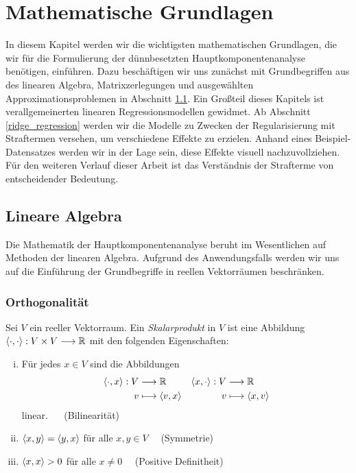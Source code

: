 \chapter{Mathematische Grundlagen}

\label{fundamentals}

In diesem Kapitel werden wir die wichtigsten mathematischen Grundlagen, die wir für die Formulierung der dünnbesetzten Hauptkomponentenanalyse benötigen, einführen. Dazu beschäftigen wir uns zunächst mit Grundbegriffen aus des linearen Algebra, Matrixzerlegungen und ausgewählten Approximationsproblemen in Abschnitt \ref{linear_algebra}. Ein Großteil dieses Kapitels ist verallgemeinerten linearen Regressionsmodellen gewidmet. Ab Abschnitt \ref{ridge_regression} werden wir die Modelle zu Zwecken der Regularisierung mit Straftermen versehen, um verschiedene Effekte zu erzielen. Anhand eines Beispiel-Datensatzes werden wir in der Lage sein, diese Effekte visuell nachzuvollziehen. Für den weiteren Verlauf dieser Arbeit ist das Verständnis der Strafterme von entscheidender Bedeutung.






\section{Lineare Algebra}
\label{linear_algebra}

Die Mathematik der Hauptkomponentenanalyse beruht im Wesentlichen auf Methoden der linearen Algebra. Aufgrund des Anwendungsfalls werden wir uns auf die Einführung der Grundbegriffe in reellen Vektorräumen beschränken.

\subsection{Orthogonalität}
\label{orthogonality}

\begin{defn}
Sei $V$ ein reeller Vektorraum. Ein \textit{Skalarprodukt} in $V$ ist eine Abbildung $\langle \cdot, \cdot \rangle: V \times V \longrightarrow \mathbb{R}$ mit den folgenden Eigenschaften:
\begin{enumerate}[(i)]
\item Für jedes $x \in V$ sind die Abbildungen
\begin{align*}
\langle \cdot, x \rangle: V & \longrightarrow \mathbb{R} & \langle x, \cdot \rangle: V & \longrightarrow \mathbb{R}\\
v & \longmapsto \langle v, x \rangle & v & \longmapsto \langle x, v \rangle
\end{align*}
linear. $\quad$ (Bilinearität)
\item $\langle x, y \rangle = \langle y, x \rangle$ für alle  $x,y \in V \quad$ (Symmetrie)
\item $\langle x, x \rangle > 0$ für alle $x \neq 0 \quad$ (Positive Definitheit)
\end{enumerate}
\end{defn}


